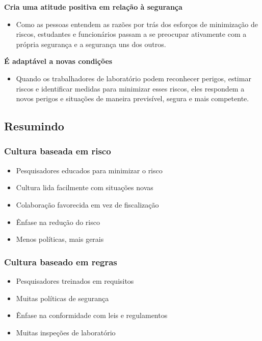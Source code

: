 \documentclass[
  letterpaper,
  DIV=11,
  numbers=noendperiod]{scrartcl}
\providecommand{\tightlist}{%
  \setlength{\itemsep}{0pt}\setlength{\parskip}{0pt}}\usepackage{longtable,booktabs,array}
\begin{document}
\textbf{Cria uma atitude positiva em relação à segurança}

\begin{itemize}
\tightlist
\item
  Como as pessoas entendem as razões por trás dos esforços de
  minimização de riscos, estudantes e funcionários passam a se preocupar
  ativamente com a própria segurança e a segurança uns dos outros.
\end{itemize}

\textbf{É adaptável a novas condições}

\begin{itemize}
\tightlist
\item
  Quando os trabalhadores de laboratório podem reconhecer perigos,
  estimar riscos e identificar medidas para minimizar esses riscos, eles
  respondem a novos perigos e situações de maneira previsível, segura e
  mais competente.
\end{itemize}

\subsection{Resumindo}\label{resumindo}

\subsubsection{Cultura baseada em risco}\label{cultura-baseada-em-risco}

\begin{itemize}
\tightlist
\item
  Pesquisadores educados para minimizar o risco
\item
  Cultura lida facilmente com situações novas
\item
  Colaboração favorecida em vez de fiscalização
\item
  Ênfase na redução do risco
\item
  Menos políticas, mais gerais
\end{itemize}

\subsubsection{Cultura baseado em
regras}\label{cultura-baseado-em-regras}

\begin{itemize}
\tightlist
\item
  Pesquisadores treinados em requisitos
\item
  Muitas políticas de segurança
\item
  Ênfase na conformidade com leis e regulamentos
\item
  Muitas inspeções de laboratório
\end{itemize}
\end{document}
